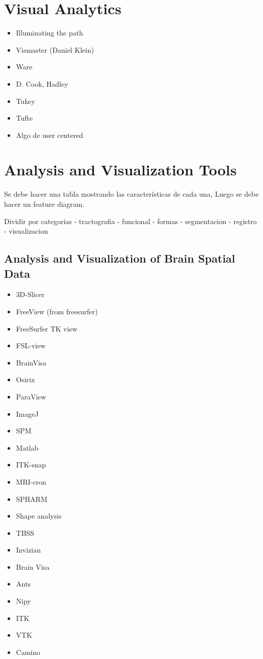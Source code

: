 
\section{Visual Analytics}
\begin{itemize}
	\item Illuminating the path
	\item Vismaster (Daniel Klein)	
	\item Ware
	\item D. Cook, Hadley
	\item Tukey
	\item Tufte	
	\item Algo de user centered
\end{itemize}


\section{Analysis and Visualization Tools}

Se debe hacer una tabla mostrando las características de cada una,
Luego se debe hacer un feature diagram.

Dividir por categorias
- tractografia
- funcional
- formas
- segmentacion
- registro
- visualizacion

\subsection{Analysis and Visualization of Brain Spatial Data}
\begin{itemize}
	\item 3D-Slicer
	\item FreeView (from freesurfer)
	\item FreeSurfer TK view
	\item FSL-view
	\item BrainVisa
	\item Osirix
	\item ParaView
	\item ImageJ
	\item SPM
	\item Matlab
	\item ITK-snap
	\item MRI-cron
	\item SPHARM
	\item Shape analysis	
	\item TBSS
	\item Invizian
	\item Brain Visa
	\item Ants
	\item Nipy
	\item ITK
	\item VTK
	\item Camino
\end{itemize}

